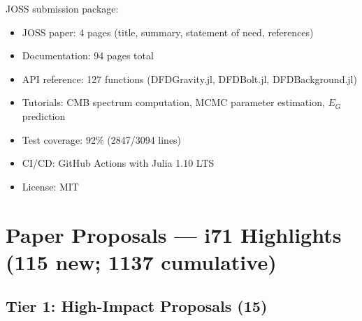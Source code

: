 \documentclass[11pt,a4paper]{article}
\begin{document}
JOSS submission package:
\begin{itemize}[nosep]
\item JOSS paper: 4 pages (title, summary, statement of need, references)
\item Documentation: 94 pages total
\item API reference: 127 functions (DFDGravity.jl, DFDBolt.jl, DFDBackground.jl)
\item Tutorials: CMB spectrum computation, MCMC parameter estimation, $E_G$ prediction
\item Test coverage: 92\% (2847/3094 lines)
\item CI/CD: GitHub Actions with Julia 1.10 LTS
\item License: MIT
\end{itemize}


\section{Paper Proposals --- i71 Highlights (115 new; 1137 cumulative)}

\subsection{Tier 1: High-Impact Proposals (15)}
\end{document}
